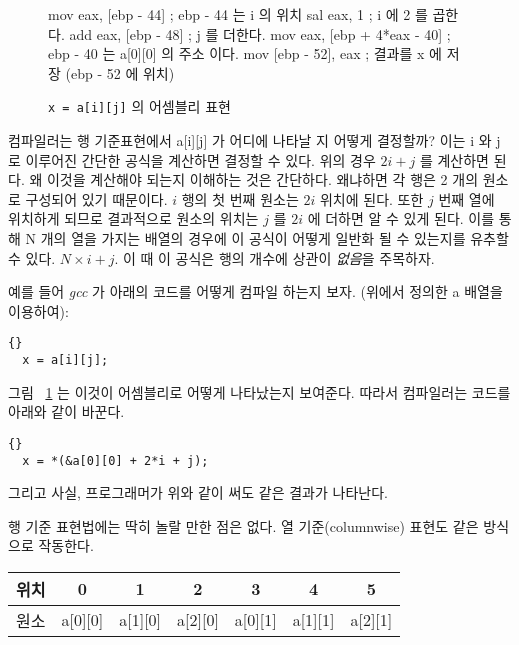\begin{figure}[t]
\begin{AsmCodeListing}[]
   mov    eax, [ebp - 44]          ; ebp - 44 는 i 의 위치
   sal    eax, 1                   ; i 에 2 를 곱한다. 
   add    eax, [ebp - 48]          ; j 를 더한다. 
   mov    eax, [ebp + 4*eax - 40]  ; ebp - 40 는 a[0][0] 의 주소 이다. 
   mov    [ebp - 52], eax          ; 결과를 x 에 저장 (ebp - 52 에 위치)
\end{AsmCodeListing}
\caption{\lstinline|x = a[i][j]| 의 어셈블리 표현 \label{fig:aij}}
\end{figure}

컴파일러는 행 기준표현에서 {\code a[i][j]} 가 어디에 나타날 지 어떻게 결정할까?
이는 {\code i} 와 {\code j} 로 이루어진 간단한 공식을 계산하면 결정할 수 있다. 위의 경우
$2i + j$ 를 계산하면 된다. 왜 이것을 계산해야 되는지 이해하는 것은 간단하다. 
왜냐하면 각 행은 2 개의 원소로 구성되어 있기 때문이다. $i$ 행의 첫 번째 원소는 $2i$ 위치에 된다.
또한 $j$ 번째 열에 위치하게 되므로 결과적으로 원소의 위치는 $j$ 를 $2i$ 에 더하면
알 수 있게 된다. 이를 통해 {\code N} 개의 열을 가지는 배열의 경우에 이 공식이 어떻게
일반화 될 수 있는지를 유추할 수 있다. $N\times i + j$. 이 때 이 공식은 행의 개수에 상관이
\emph{없음}을 주목하자. 

예를 들어 \emph{gcc} 가 아래의 코드를 어떻게 컴파일 하는지 보자. (위에서 정의한
{\code a} 배열을 이용하여):

\begin{lstlisting}[stepnumber=0]{}
  x = a[i][j];
\end{lstlisting}

그림 ~\ref{fig:aij} 는 이것이 어셈블리로 어떻게 나타났는지 보여준다.
따라서 컴파일러는 코드를 아래와 같이 바꾼다. 
\begin{lstlisting}[stepnumber=0]{}
  x = *(&a[0][0] + 2*i + j);
\end{lstlisting}
그리고 사실, 프로그래머가 위와 같이 써도 같은 결과가 나타난다. 

행 기준 표현법에는 딱히 놀랄 만한 점은 없다. 열 기준(columnwise) 표현도
같은 방식으로 작동한다. 

\parbox{\textwidth}{
\vspace{0.5em}
\centering
\begin{tabular}{||l|c|c|c|c|c|c||}
\hline
위치 & 0 & 1 & 2 & 3 & 4 & 5 \\
\hline
원소 & a[0][0] & a[1][0] & a[2][0] & a[0][1] & a[1][1] & a[2][1]  \\
\hline
\end{tabular}
\vspace{0.5em}
}
\noindent 

